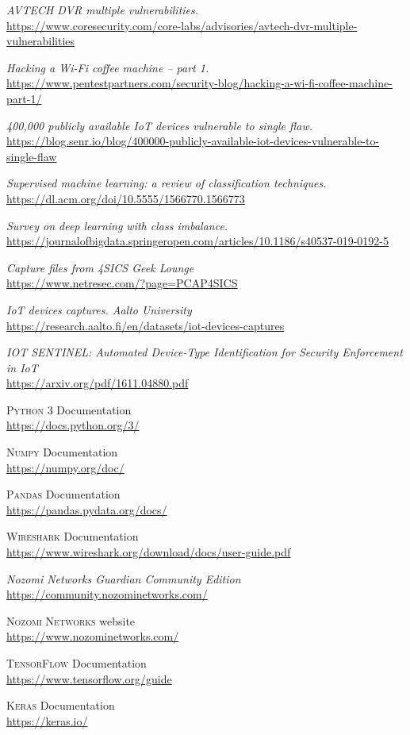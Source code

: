 \begin{thebibliography}{99}
\textit{AVTECH DVR multiple vulnerabilities.}
\\\url{https://www.coresecurity.com/core-labs/advisories/avtech-dvr-multiple-vulnerabilities}

\textit{Hacking a Wi-Fi coffee machine – part 1.}
\\\url{https://www.pentestpartners.com/security-blog/hacking-a-wi-fi-coffee-machine-part-1/}

\textit{400,000 publicly available IoT devices vulnerable to single
flaw.}
\\\url{https://blog.senr.io/blog/400000-publicly-available-iot-devices-vulnerable-to-single-flaw}

\textit{Supervised machine learning: a review of classification techniques.}
\\\url{https://dl.acm.org/doi/10.5555/1566770.1566773}

\textit{Survey on deep learning with class imbalance.}
\\\url{https://journalofbigdata.springeropen.com/articles/10.1186/s40537-019-0192-5}


\textit{Capture files from 4SICS Geek Lounge}
\\\url{https://www.netresec.com/?page=PCAP4SICS}

\textit{IoT devices captures. Aalto University}
\\\url{https://research.aalto.fi/en/datasets/iot-devices-captures}

\textit{IOT SENTINEL: Automated Device-Type
Identification for Security Enforcement in IoT}
\\\url{https://arxiv.org/pdf/1611.04880.pdf}

\textsc{Python 3} Documentation
\\\url{https://docs.python.org/3/}

\textsc{Numpy} Documentation
\\\url{https://numpy.org/doc/}

\textsc{Pandas} Documentation
\\\url{https://pandas.pydata.org/docs/}

\textsc{Wireshark} Documentation
\\\url{https://www.wireshark.org/download/docs/user-guide.pdf}


\textit{Nozomi Networks Guardian Community Edition}
\\\url{https://community.nozominetworks.com/}

\textsc{Nozomi Networks} website
\\\url{https://www.nozominetworks.com/}

 
\textsc{TensorFlow} Documentation 
\\\url{https://www.tensorflow.org/guide}

\textsc{Keras} Documentation 
\\\url{https://keras.io/}







\end{thebibliography}
